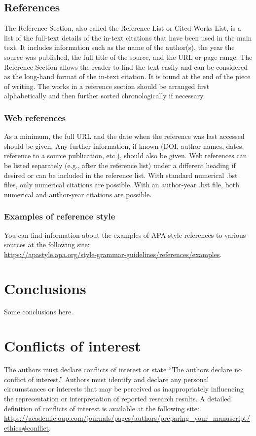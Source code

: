 \documentclass[12pt,a4paper]{article}
\begin{document}
\subsection{References}
The Reference Section, also called the Reference List or Cited Works List, is a list of the full-text details of the in-text citations that have been used in the main text. It includes information such as the name of the author(s), the year the source was published, the full title of the source, and the URL or page range. The Reference Section allows the reader to find the text easily and can be considered as the long-hand format of the in-text citation. It is found at the end of the piece of writing. The works in a reference section should be arranged first alphabetically and then further sorted chronologically if necessary.

\subsubsection{Web references}
As a minimum, the full URL and the date when the reference was last accessed should be given. Any further information, if known (DOI, author names, dates, reference to a source publication, etc.), should also be given. Web references can be listed separately (e.g., after the reference list) under a different heading if desired or can be included in the reference list. With standard numerical .bst files, only numerical citations are possible. With an author-year .bst file, both numerical and author-year citations are possible. 

\subsubsection{Examples of reference style}
You can find information about the examples of APA-style references to various sources at the following site:\\
\url{https://apastyle.apa.org/style-grammar-guidelines/references/examples}.


\section{Conclusions}
Some conclusions here.


\section*{Conflicts of interest} 
The authors must declare conflicts of interest or state “The authors declare no conflict of interest.” Authors must identify and declare any personal circumstances or interests that may be perceived as inappropriately influencing the representation or interpretation of reported research results. A detailed definition of conflicts of interest is available at the following site: \url{https://academic.oup.com/journals/pages/authors/preparing_your_manuscript/ethics#conflict}.
\end{document}
